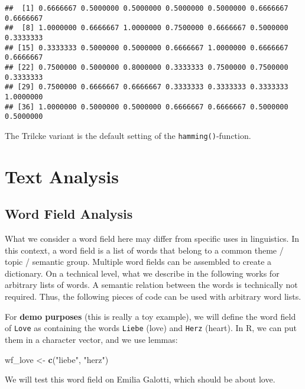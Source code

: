 \documentclass[]{book}
\newenvironment{Shaded}{\begin{snugshade}}{\end{snugshade}}
\newcommand{\KeywordTok}[1]{\textcolor[rgb]{0.13,0.29,0.53}{\textbf{#1}}}
\newcommand{\NormalTok}[1]{#1}
\newcommand{\StringTok}[1]{\textcolor[rgb]{0.31,0.60,0.02}{#1}}
\begin{document}
\begin{verbatim}
##  [1] 0.6666667 0.5000000 0.5000000 0.5000000 0.5000000 0.6666667 0.6666667
##  [8] 1.0000000 0.6666667 1.0000000 0.7500000 0.6666667 0.5000000 0.3333333
## [15] 0.3333333 0.5000000 0.5000000 0.6666667 1.0000000 0.6666667 0.6666667
## [22] 0.7500000 0.5000000 0.8000000 0.3333333 0.7500000 0.7500000 0.3333333
## [29] 0.7500000 0.6666667 0.6666667 0.3333333 0.3333333 0.3333333 1.0000000
## [36] 1.0000000 0.5000000 0.5000000 0.6666667 0.6666667 0.5000000 0.5000000
\end{verbatim}

The Trilcke variant is the default setting of the \texttt{hamming()}-function.

\hypertarget{part-text-analysis}{%
\part{Text Analysis}\label{part-text-analysis}}

\hypertarget{word-field-analysis}{%
\chapter{Word Field Analysis}\label{word-field-analysis}}

What we consider a word field here may differ from specific uses in linguistics. In this context, a word field is a list of words that belong to a common theme / topic / semantic group. Multiple word fields can be assembled to create a dictionary. On a technical level, what we describe in the following works for arbitrary lists of words. A semantic relation between the words is technically not required. Thus, the following pieces of code can be used with arbitrary word lists.

For \textbf{demo purposes} (this is really a toy example), we will define the word field of \texttt{Love} as containing the words \texttt{Liebe} (love) and \texttt{Herz} (heart).
In R, we can put them in a character vector, and we use lemmas:

\begin{Shaded}
\begin{Highlighting}[]
\NormalTok{wf_love <-}\StringTok{ }\KeywordTok{c}\NormalTok{(}\StringTok{"liebe"}\NormalTok{, }\StringTok{"herz"}\NormalTok{)}
\end{Highlighting}
\end{Shaded}

We will test this word field on Emilia Galotti, which should be about love.
\end{document}
